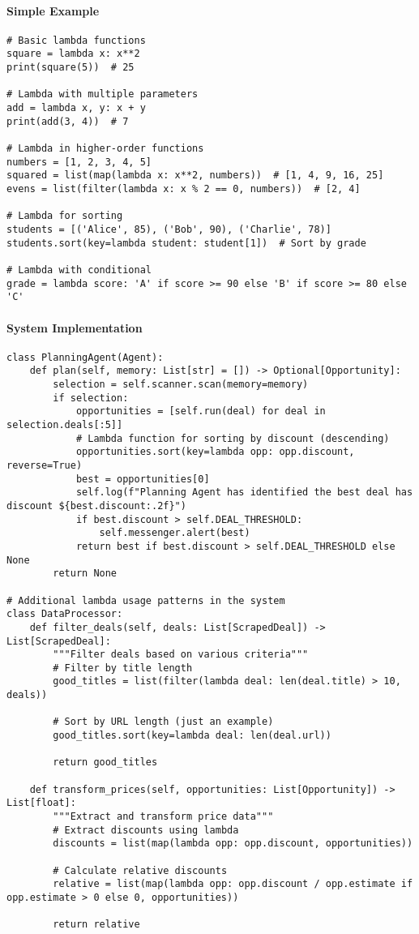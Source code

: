 \paragraph{Simple Example}
\begin{lstlisting}[caption=Lambda Function Examples]
# Basic lambda functions
square = lambda x: x**2
print(square(5))  # 25

# Lambda with multiple parameters
add = lambda x, y: x + y
print(add(3, 4))  # 7

# Lambda in higher-order functions
numbers = [1, 2, 3, 4, 5]
squared = list(map(lambda x: x**2, numbers))  # [1, 4, 9, 16, 25]
evens = list(filter(lambda x: x % 2 == 0, numbers))  # [2, 4]

# Lambda for sorting
students = [('Alice', 85), ('Bob', 90), ('Charlie', 78)]
students.sort(key=lambda student: student[1])  # Sort by grade

# Lambda with conditional
grade = lambda score: 'A' if score >= 90 else 'B' if score >= 80 else 'C'
\end{lstlisting}

\paragraph{System Implementation}
\begin{lstlisting}[caption=Lambda Functions in Agent System]
class PlanningAgent(Agent):
    def plan(self, memory: List[str] = []) -> Optional[Opportunity]:
        selection = self.scanner.scan(memory=memory)
        if selection:
            opportunities = [self.run(deal) for deal in selection.deals[:5]]
            # Lambda function for sorting by discount (descending)
            opportunities.sort(key=lambda opp: opp.discount, reverse=True)
            best = opportunities[0]
            self.log(f"Planning Agent has identified the best deal has discount ${best.discount:.2f}")
            if best.discount > self.DEAL_THRESHOLD:
                self.messenger.alert(best)
            return best if best.discount > self.DEAL_THRESHOLD else None
        return None

# Additional lambda usage patterns in the system
class DataProcessor:
    def filter_deals(self, deals: List[ScrapedDeal]) -> List[ScrapedDeal]:
        """Filter deals based on various criteria"""
        # Filter by title length
        good_titles = list(filter(lambda deal: len(deal.title) > 10, deals))
        
        # Sort by URL length (just an example)
        good_titles.sort(key=lambda deal: len(deal.url))
        
        return good_titles
    
    def transform_prices(self, opportunities: List[Opportunity]) -> List[float]:
        """Extract and transform price data"""
        # Extract discounts using lambda
        discounts = list(map(lambda opp: opp.discount, opportunities))
        
        # Calculate relative discounts
        relative = list(map(lambda opp: opp.discount / opp.estimate if opp.estimate > 0 else 0, opportunities))
        
        return relative
\end{lstlisting}

